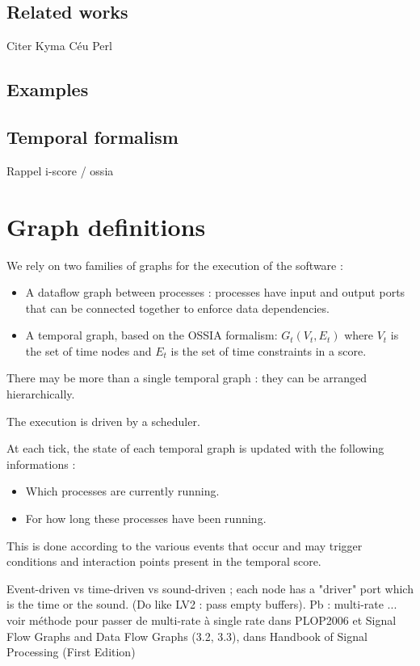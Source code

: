 \documentclass{article}
\begin{document}
    \subsection{Related works}
    Citer Kyma
    Céu
    Perl
    
    \subsection{Examples}
    
    \subsection{Temporal formalism}
    Rappel i-score / ossia
    
    
	\section{Graph definitions}
    We rely on two families of graphs for the execution of the software : 
    \begin{itemize}
        \item A dataflow graph between processes : processes have input and output ports that can be connected together to enforce data dependencies.
        \item A temporal graph, based on the OSSIA formalism: $G_t(V_t, E_t)$ where $V_t$ is the set of time nodes and $E_t$ is the set of time constraints in a score.
    \end{itemize}
    There may be more than a single temporal graph : they can be arranged hierarchically.
    
    The execution is driven by a scheduler. 
    
    At each tick, the state of each temporal graph is updated with the following informations : 
    \begin{itemize}
        \item Which processes are currently running.
        \item For how long these processes have been running.
    \end{itemize}

    This is done according to the various events that occur and may trigger conditions and interaction points present in the temporal score.
    
    Event-driven vs time-driven vs sound-driven ; each node has a "driver" port which is the time or the sound. (Do like LV2 : pass empty buffers). Pb : multi-rate ... voir méthode pour passer de multi-rate à single rate dans PLOP2006 et Signal Flow Graphs and Data Flow Graphs (3.2, 3.3), dans Handbook of Signal Processing (First Edition)
    
\end{document}

